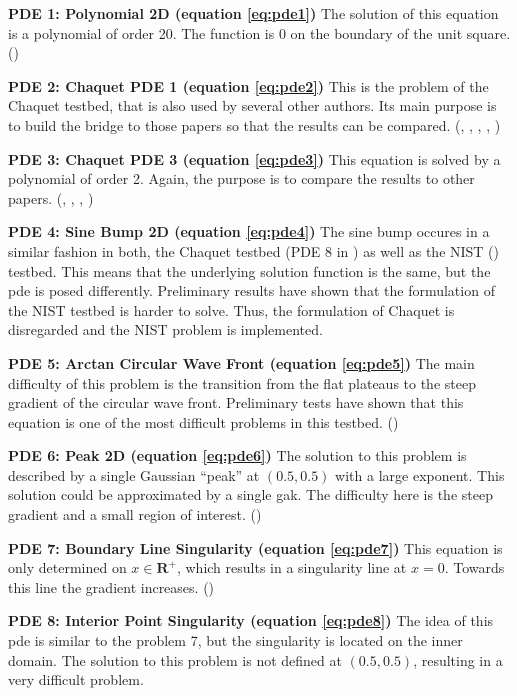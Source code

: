\documentclass[./\jobname.tex]{subfiles}
\begin{document}
\textbf{PDE 1: Polynomial 2D (equation \ref{eq:pde1})} The solution of this equation is a polynomial of order 20. The function is 0 on the boundary of the unit square. (\cite{mitchell_nist_2018}) 

\textbf{PDE 2: Chaquet PDE 1 (equation \ref{eq:pde2})} This is the problem of the Chaquet testbed, that is also used by several other authors. Its main purpose is to build the bridge to those papers so that the results can be compared. (\cite{chaquet_using_2019}, \cite{chaquet_solving_2012}, \cite{tsoulos_solving_2006}, \cite{sobester_genetic_2008}, \cite{panagant_solving_2014}) 

\textbf{PDE 3: Chaquet PDE 3 (equation \ref{eq:pde3})} This equation is solved by a polynomial of order 2. Again, the purpose is to compare the results to other papers. (\cite{chaquet_using_2019}, \cite{chaquet_solving_2012}, \cite{tsoulos_solving_2006}, \cite{panagant_solving_2014}) 

\textbf{PDE 4: Sine Bump 2D (equation \ref{eq:pde4})} The sine bump occures in a similar fashion in both, the Chaquet testbed (PDE 8 in \cite{chaquet_using_2019}) as well as the NIST (\cite{mitchell_nist_2018}) testbed. This means that the underlying solution function is the same, but the \gls{pde} is posed differently. Preliminary results have shown that the formulation of the NIST testbed is harder to solve. Thus, the formulation of Chaquet is disregarded and the NIST problem is implemented. 

\textbf{PDE 5: Arctan Circular Wave Front (equation \ref{eq:pde5})} The main difficulty of this problem is the transition from the flat plateaus to the steep gradient of the circular wave front. Preliminary tests have shown that this equation is one of the most difficult problems in this testbed. (\cite{mitchell_nist_2018})

\textbf{PDE 6: Peak 2D (equation \ref{eq:pde6})} The solution to this problem is described by a single Gaussian ``peak'' at $(0.5, 0.5)$ with a large exponent. This solution could be approximated by a single \gls{gak}. The difficulty here is the steep gradient and a small region of interest. (\cite{mitchell_nist_2018})

\textbf{PDE 7: Boundary Line Singularity (equation \ref{eq:pde7})} This equation is only determined on $x \in \mathbf{R}^{+}$, which results in a singularity line at $x = 0$. Towards this line the gradient increases.  (\cite{mitchell_nist_2018})

\textbf{PDE 8: Interior Point Singularity (equation \ref{eq:pde8})} The idea of this \gls{pde} is similar to the problem 7, but the singularity is located on the inner domain. The solution to this problem is not defined at $(0.5, 0.5)$, resulting in a very difficult problem. 
\end{document}
